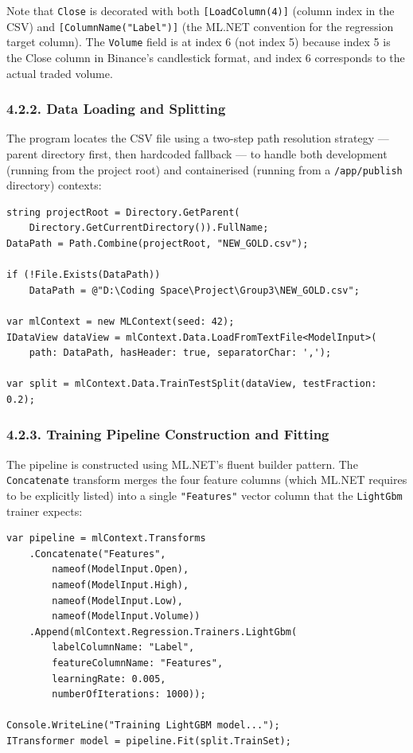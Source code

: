 Note that \texttt{Close} is decorated with both \texttt{[LoadColumn(4)]} (column index in the CSV) and \texttt{[ColumnName("Label")]} (the ML.NET convention for the regression target column). The \texttt{Volume} field is at index 6 (not index 5) because index 5 is the Close column in Binance's candlestick format, and index 6 corresponds to the actual traded volume.

\subsubsection{4.2.2. Data Loading and Splitting}
The program locates the CSV file using a two-step path resolution strategy --- parent directory first, then hardcoded fallback --- to handle both development (running from the project root) and containerised (running from a \texttt{/app/publish} directory) contexts:

\begin{lstlisting}
string projectRoot = Directory.GetParent(
    Directory.GetCurrentDirectory()).FullName;
DataPath = Path.Combine(projectRoot, "NEW_GOLD.csv");

if (!File.Exists(DataPath))
    DataPath = @"D:\Coding Space\Project\Group3\NEW_GOLD.csv";

var mlContext = new MLContext(seed: 42);
IDataView dataView = mlContext.Data.LoadFromTextFile<ModelInput>(
    path: DataPath, hasHeader: true, separatorChar: ',');

var split = mlContext.Data.TrainTestSplit(dataView, testFraction: 0.2);
\end{lstlisting}

\subsubsection{4.2.3. Training Pipeline Construction and Fitting}
The pipeline is constructed using ML.NET's fluent builder pattern. The \texttt{Concatenate} transform merges the four feature columns (which ML.NET requires to be explicitly listed) into a single \texttt{"Features"} vector column that the \texttt{LightGbm} trainer expects:

\begin{lstlisting}
var pipeline = mlContext.Transforms
    .Concatenate("Features",
        nameof(ModelInput.Open),
        nameof(ModelInput.High),
        nameof(ModelInput.Low),
        nameof(ModelInput.Volume))
    .Append(mlContext.Regression.Trainers.LightGbm(
        labelColumnName: "Label",
        featureColumnName: "Features",
        learningRate: 0.005,
        numberOfIterations: 1000));

Console.WriteLine("Training LightGBM model...");
ITransformer model = pipeline.Fit(split.TrainSet);
\end{lstlisting}


